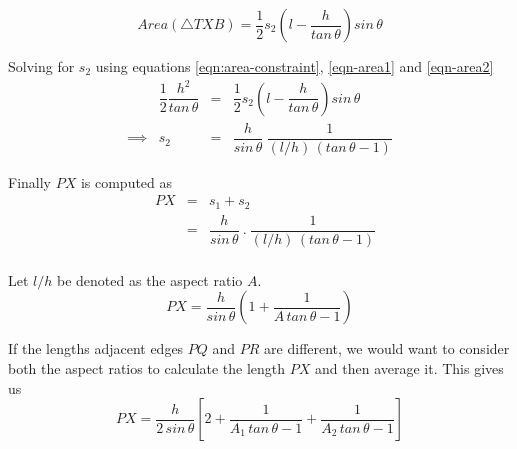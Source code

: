 \documentclass[conf]{new-aiaa}
\begin{document}
\begin{equation}
    Area(\bigtriangleup TXB) = \dfrac{1}{2} s_2 \left(l - \dfrac{h}{tan \, \theta}\right) sin \, \theta
    \label{eqn-area2}    
\end{equation}

Solving for $s_2$ using equations \ref{eqn:area-constraint}, \ref{eqn-area1} and \ref{eqn-area2}
\begin{equation}
\begin{array}{llcl}
     & \dfrac{1}{2} \dfrac{h^2}{tan \, \theta}  & = & \dfrac{1}{2} s_2 \left(l - \dfrac{h}{tan \, \theta} \right) sin \, \theta  \\
    \implies & s_2& = & \dfrac{h}{sin \, \theta} \: \dfrac{1}{ (l/h)\, (tan \, \theta - 1)}
\end{array}
\end{equation}


Finally $PX$ is computed as
\begin{equation}
\begin{array}{llcl}
     & PX & = & s_1 + s_2 \\
    & & = & \dfrac{h}{sin \, \theta} \: . \: \dfrac{1}{ (l/h)\, (tan \, \theta - 1)}\\
\end{array}
\end{equation}

Let $l/h$ be denoted as the aspect ratio $A$.
\begin{equation}
    PX  = \dfrac{h}{sin \, \theta} \left( 1 + \dfrac{1}{A\, tan \, \theta - 1} \right)
\end{equation}

If the lengths adjacent edges $PQ$ and $PR$ are different, we would want to consider both the aspect ratios to calculate the length $PX$ and then average it. This gives us
\begin{equation}
    PX = \dfrac{h}{2 \, sin\, \theta} \left[ 2 + \dfrac{1}{A_1\, tan \, \theta - 1} + \dfrac{1}{A_2\, tan \, \theta - 1} \right]
\end{equation}
\end{document}
